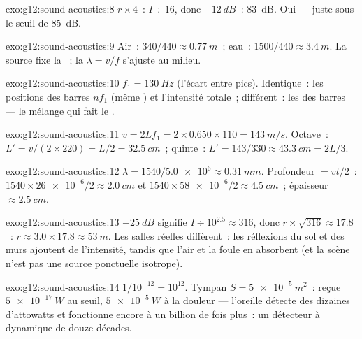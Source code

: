 \begin{solution}{exo:g12:sound-acoustics:8}
$r \times 4$~: $I \div 16$, donc $-\qty{12}{dB}$~: \qty{83}{dB}. Oui ---
juste sous le seuil de \qty{85}{dB}.
\end{solution}

\begin{solution}{exo:g12:sound-acoustics:9}
Air~: $340/440 \approx \qty{0.77}{m}$~; eau~: $1500/440 \approx
\qty{3.4}{m}$. La source fixe la ~; la
 $\lambda = v/f$ s'ajuste au milieu.
\end{solution}

\begin{solution}{exo:g12:sound-acoustics:10}
$f_1 = \qty{130}{Hz}$ (l'écart entre pics). Identique~: les positions
des barres $nf_1$ (même ) et l'intensité totale~;
différent~: les  des barres --- le mélange qui fait le
.
\end{solution}

\begin{solution}{exo:g12:sound-acoustics:11}
$v = 2Lf_1 = 2 \times 0.650 \times 110 = \qty{143}{m/s}$. Octave~:
$L' = v/(2 \times 220) = L/2 = \qty{32.5}{cm}$~; quinte~:
$L' = 143/330 \approx \qty{43.3}{cm} = 2L/3$.
\end{solution}

\begin{solution}{exo:g12:sound-acoustics:12}
$\lambda = 1540/\num{5.0e6} \approx \qty{0.31}{mm}$. Profondeur $= vt/2$~:
$1540 \times \num{26e-6}/2 \approx \qty{2.0}{cm}$ et
$1540 \times \num{58e-6}/2 \approx \qty{4.5}{cm}$~; épaisseur
$\approx \qty{2.5}{cm}$.
\end{solution}

\begin{solution}{exo:g12:sound-acoustics:13}
$-\qty{25}{dB}$ signifie $I \div 10^{2.5} \approx 316$, donc
$r \times \sqrt{316} \approx 17.8$~: $r \approx 3.0 \times 17.8
\approx \qty{53}{m}$. Les salles réelles diffèrent~: les réflexions du
sol et des murs ajoutent de l'intensité, tandis que l'air et la foule
en absorbent (et la scène n'est pas une source ponctuelle isotrope).
\end{solution}

\begin{solution}{exo:g12:sound-acoustics:14}
$1/10^{-12} = 10^{12}$. Tympan $S = \qty{5e-5}{m^2}$~: 
reçue $\qty{5e-17}{W}$ au seuil, $\qty{5e-5}{W}$ à la douleur ---
l'oreille détecte des dizaines d'attowatts et fonctionne encore à un
billion de fois plus~: un détecteur à dynamique de douze
décades.
\end{solution}

